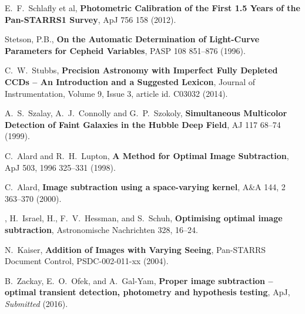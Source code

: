 \documentclass[12pt]{article}
\begin{document}
\begin{thebibliography}{10}
 E.~F.~Schlafly et al,
  \textbf{Photometric Calibration of the First 1.5 Years of the Pan-STARRS1 Survey},
  ApJ 756 158 (2012).

 Stetson, P.B.,
  \textbf{On the Automatic Determination of Light-Curve Parameters for Cepheid Variables},
  PASP 108 851--876 (1996).

 C.~W.~Stubbs,
  \textbf{Precision Astronomy with Imperfect Fully Depleted CCDs -- An Introduction and a Suggested Lexicon},
  Journal of Instrumentation, Volume 9, Issue 3, article id. C03032 (2014).

 A.~S.~Szalay, A.~J.~Connolly and G.~P.~Szokoly,
  \textbf{Simultaneous Multicolor Detection of Faint Galaxies in the Hubble Deep Field},
  AJ 117 68--74 (1999).

 C.~Alard and R.~H.~Lupton,
  \textbf{A Method for Optimal Image Subtraction},
  ApJ 503, 1996 325--331 (1998).

 C.~Alard,
  \textbf{Image subtraction using a space-varying kernel},
  A\&A 144, 2 363–370 (2000).

, H.~Israel, H., F.~V.~Hessman, and S.~Schuh,
  \textbf{Optimising optimal image subtraction},
  Astronomische Nachrichten 328, 16--24.

 N.~Kaiser,
  \textbf{Addition of Images with Varying Seeing},
  Pan-STARRS Document Control, PSDC-002-011-xx (2004).

 B.~Zackay, E.~O.~Ofek, and A.~Gal-Yam,
  \textbf{Proper image subtraction -- optimal transient detection, photometry and hypothesis testing},
  ApJ, {\em Submitted} (2016).

\end{thebibliography}
\end{document}
